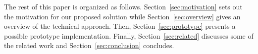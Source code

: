 


The rest of this paper is organized as follows.
Section~\ref{sec:motivation} sets out the motivation for our proposed
solution while Section~\ref{sec:overview} gives an overview of the
technical approach.  Then, Section~\ref{sec:prototype} presents a
possible prototype implementation. Finally, Section~\ref{sec:related}
discusses some of the related work and Section~\ref{sec:conclusion}
concludes.



